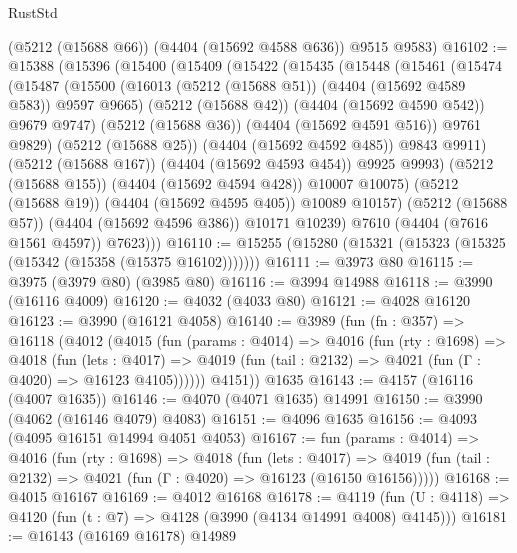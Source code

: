 \begin{lexlean}{RustStd}
\begin{coremodule}
{\begin{coremodule}
{{{{{{{{{{{{{{{{      (@5212 (@15688 @66))
      (@4404 (@15692 @4588 @636))
      @9515
      @9583)
@16102 := @15388
    (@15396
      (@15400
        (@15409
          (@15422
            (@15435
              (@15448
                (@15461
                  (@15474
                    (@15487
                      (@15500
                        (@16013 (@5212 (@15688 @51)) (@4404 (@15692 @4589 @583)) @9597 @9665)
                        (@5212 (@15688 @42))
                        (@4404 (@15692 @4590 @542))
                        @9679
                        @9747)
                      (@5212 (@15688 @36))
                      (@4404 (@15692 @4591 @516))
                      @9761
                      @9829)
                    (@5212 (@15688 @25))
                    (@4404 (@15692 @4592 @485))
                    @9843
                    @9911)
                  (@5212 (@15688 @167))
                  (@4404 (@15692 @4593 @454))
                  @9925
                  @9993)
                (@5212 (@15688 @155))
                (@4404 (@15692 @4594 @428))
                @10007
                @10075)
              (@5212 (@15688 @19))
              (@4404 (@15692 @4595 @405))
              @10089
              @10157)
            (@5212 (@15688 @57))
            (@4404 (@15692 @4596 @386))
            @10171
            @10239)
          @7610
          (@4404 (@7616 @1561 @4597))
          @7623)))
@16110 := @15255 (@15280 (@15321 (@15323 (@15325 (@15342 (@15358 (@15375 @16102)))))))
@16111 := @3973 @80
@16115 := @3975 (@3979 @80) (@3985 @80)
@16116 := @3994 @14988
@16118 := @3990 (@16116 @4009)
@16120 := @4032 (@4033 @80)
@16121 := @4028 @16120
@16123 := @3990 (@16121 @4058)
@16140 := @3989
    (fun (fn : @357) =>
    @16118
      (@4012
        (@4015
          (fun (params : @4014) =>
          @4016
            (fun (rty : @1698) =>
            @4018
              (fun (lets : @4017) =>
              @4019 (fun (tail : @2132) => @4021 (fun (Γ : @4020) => @16123 @4105))))))
        @4151))
    @1635
@16143 := @4157 (@16116 (@4007 @1635))
@16146 := @4070 (@4071 @1635) @14991
@16150 := @3990 (@4062 (@16146 @4079) @4083)
@16151 := @4096 @1635
@16156 := @4093 (@4095 @16151 @14994 @4051 @4053)
@16167 := fun (params : @4014) =>
  @4016
    (fun (rty : @1698) =>
    @4018
      (fun (lets : @4017) =>
      @4019 (fun (tail : @2132) => @4021 (fun (Γ : @4020) => @16123 (@16150 @16156)))))
@16168 := @4015 @16167
@16169 := @4012 @16168
@16178 := @4119
    (fun (U : @4118) => @4120 (fun (t : @7) => @4128 (@3990 (@4134 @14991 @4008) @4145)))
@16181 := @16143 (@16169 @16178) @14989
}}}}}}}}}}}}}}}}
\end{coremodule}}
\end{coremodule}
\end{lexlean}
